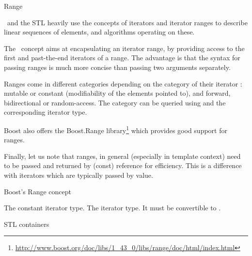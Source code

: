 \begin{ccRefConcept}{Range}

\ccDefinition

\cgal\ and the STL heavily use the concepts of iterators and iterator ranges
to describe linear sequences of elements, and algorithms operating on these.

The \ccRefName\ concept aims at encapsulating an iterator range, by providing
access to the first and past-the-end iterators of a range.  The advantage is
that the syntax for passing ranges is much more concise than passing two
arguments separately.


Ranges come in different categories depending on the category of their iterator :
mutable or constant (modifiability of the elements pointed to), and forward,
bidirectional or random-access.  The category can be queried using
 and the corresponding iterator type.

Boost also offers the Boost.Range
library\footnote{\url{http://www.boost.org/doc/libs/1_43_0/libs/range/doc/html/index.html}}
which provides good support for ranges.

Finally, let us note that ranges, in general (especially in template context)
need to be passed and returned by (const) reference for efficiency.  This is a
difference with iterators which are typically passed by value.

\ccRefines

Boost's Range concept

{}  %

\ccTypes

 {The constant iterator type.}
\ccGlue
{} {The iterator type.  It must be convertible to .}


\def\ccTagRmTrailingConst{\ccFalse}

\ccGlue
{}

\ccGlue
{}

\ccGlue
{}

\def\ccTagRmTrailingConst{\ccTrue}

\ccHasModels
STL containers\\

\end{ccRefConcept}
